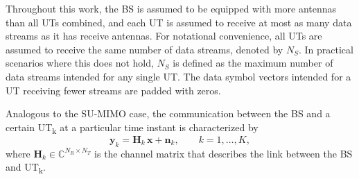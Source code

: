 Throughout this work, the \ac{BS} is assumed to be equipped with more antennas than all \acp{UT} combined, and each \ac{UT} is assumed to receive at most as many data streams as it has receive antennas.
For notational convenience, all \acp{UT} are assumed to receive the same number of data streams, denoted by $N_S$. In practical scenarios where this does not hold, $N_S$ is defined as the maximum number of data streams intended for any single \ac{UT}. The data symbol vectors intended for a \ac{UT} receiving fewer streams are padded with zeros.

Analogous to the \ac{SU}-\ac{MIMO} case, the communication between the \ac{BS} and a certain \ac{UT}\textsubscript{k} at a particular time instant is characterized by
\begin{equation}
\label{eq:mu_mimo_io}
    \mathbf{y}_k = \mathbf{H}_k \, \mathbf{x} + \mathbf{n}_k, \qquad k = 1, \dots, K,
\end{equation}
where $\mathbf{H}_k \in \mathbb{C}^{N_R \times N_T}$ is the channel matrix that describes the link between the \ac{BS} and \ac{UT}\textsubscript{k}.

